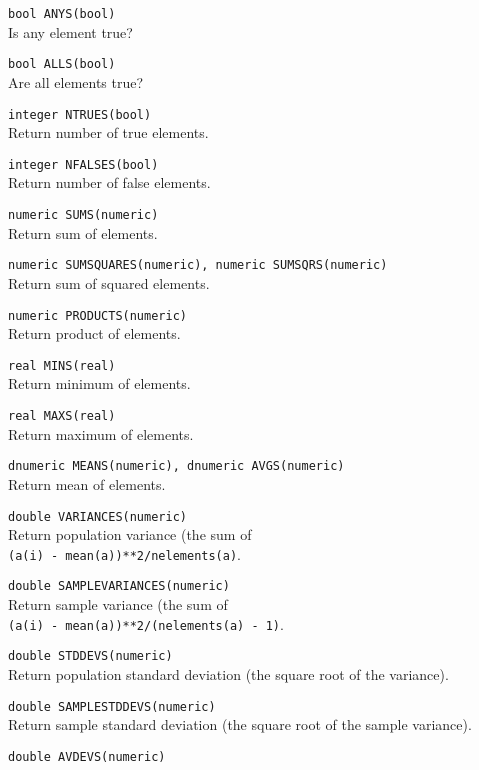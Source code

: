 \begin{description}
  \item[] \texttt{bool ANYS(bool)}\\
    Is any element true?
  \item[] \texttt{bool ALLS(bool)}\\
    Are all elements true?
  \item[] \texttt{integer NTRUES(bool)}\\
    Return number of true elements.
  \item[] \texttt{integer NFALSES(bool)}\\
    Return number of false elements.
  \item[] \texttt{numeric SUMS(numeric)}\\
    Return sum of elements.
  \item[] \texttt{numeric SUMSQUARES(numeric), numeric SUMSQRS(numeric)}\\
    Return sum of squared elements.
  \item[] \texttt{numeric PRODUCTS(numeric)}\\
    Return product of elements.
  \item[] \texttt{real MINS(real)}\\
    Return minimum of elements.
  \item[] \texttt{real MAXS(real)}\\
    Return maximum of elements.
  \item[] \texttt{dnumeric MEANS(numeric), dnumeric AVGS(numeric)}\\
    Return mean of elements.
  \item[] \texttt{double VARIANCES(numeric)}\\
    Return population variance (the sum of
    \\\texttt{(a(i) - mean(a))**2/nelements(a)}.
  \item[] \texttt{double SAMPLEVARIANCES(numeric)}\\
    Return sample variance (the sum of
    \\\texttt{(a(i) - mean(a))**2/(nelements(a) - 1)}.
  \item[] \texttt{double STDDEVS(numeric)}\\
    Return population standard deviation (the square root of the variance).
  \item[] \texttt{double SAMPLESTDDEVS(numeric)}\\
    Return sample standard deviation (the square root of the sample variance).
  \item[] \texttt{double AVDEVS(numeric)}\\

\end{description}

